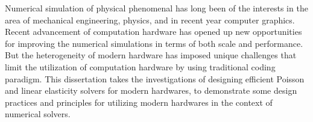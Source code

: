 Numerical simulation of physical phenomenal has long been of the interests in the area of mechanical engineering, physics, and in recent year computer graphics. Recent advancement of computation hardware has opened up new opportunities for improving the numerical simulations in terms of both scale and performance. But the heterogeneity of modern  hardware has imposed unique challenges that limit the utilization of computation hardware by using traditional coding paradigm. This dissertation takes the investigations of designing efficient Poisson and linear elasticity solvers for modern hardwares, to demonstrate some design practices and principles for utilizing modern hardwares in the context of numerical solvers.


